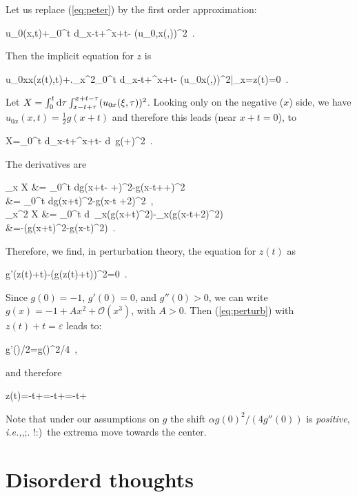 \documentclass[12pt,a4paper]{article}
\def\eref#1{(\ref{#1})}
\def\thecomma{\ifx,\thenewxt \else\ifx;\thenext \else\ifx.\thenext
	\else\ifx!\thenext \else\ifx:\thenext\else\ifx)\thenext \else \
	\fi\fi\fi\fi\fi\fi}
\def\condblank{\futurelet\thenext\thecomma}
\def\ie{{\it i.e.,}\condblank}
\numberwithin{equation}{section}
\theoremstyle{definition} %
\def\HALF{{\textstyle\frac{1}{2}}}
\def\d{{\rm d}}
\def\OO{{\mathcal O}}
\let\epsilon=\varepsilon
\begin{document}
Let us replace \eref{eq:peter} by the first order approximation:
\begin{equ}
 u_0(x,t)+\alpha \int_0^t \d\tau \int_{x-t+\tau }^{x+t-\tau }
 (u_{0,x}(\xi,\tau ))^2~.
\end{equ}
Then the implicit equation for $z$  is
\begin{equ}
  u_{0xx}(z(t),t)+\left .\alpha \partial_x^2\int_0^t \d\tau \int_{x-t+\tau }^{x+t-\tau }
  (u_{0x}(\xi,\tau ))^2\right|_{x=z(t)}=0~.
\end{equ}
Let $X=\int_0^t \d\tau \int_{x-t+\tau }^{x+t-\tau }
  (u_{0x}(\xi,\tau ))^2$.  
Looking only on the negative ($x$) side, we have $u_{0x}(x,t)=\HALF g(x+t)$ and therefore
this leads (near $x+t=0$), to
\begin{equ}
  X=\int_0^t \d\tau  \int_{x-t+\tau }^{x+t-\tau } \d \xi\, g(\xi+\tau)^2~.
\end{equ}
The derivatives are
\begin{equa}
  \partial_x X &= \int_0^t \d\tau  g(x+t-\tau
  +\tau)^2-g(x-t+\tau +\tau)^2\\
   &= \int_0^t \d\tau  g(x+t)^2-g(x-t +2\tau)^2~,\\
  \partial_x^2 X &= \int_0^t \d\tau \,
  \partial_x(g(x+t)^2)-\partial_x(g(x-t+2\tau)^2)\\
  &=-\frac{1}{4}\left(g(x+t)^2-g(x-t)^2\right)~.
\end{equa}
Therefore, we find, in perturbation theory, the equation for $z(t)$ as
\begin{equ}\label{eq:perturb}
  g'(z(t)+t)-(g(z(t)+t))^2=0~.
\end{equ}
Since $g(0)=-1$, $g'(0)=0$, and $g''(0)>0$, we can write
$g(x)=-1+Ax^2+\OO(x^3)$, with $A>0$.
Then \eref{eq:perturb} with $z(t)+t=\epsilon $ leads to:
\begin{equa}
  g'(\epsilon )/2=\alpha g(\epsilon )^2/4~,
\end{equa}
and therefore
\begin{equa}
  z(t)=-t+\epsilon =-t+=-t+
\end{equa}
Note that under our assumptions on $g$ the shift ${\alpha
  g(0)^2}/({4g''(0)})$ is \emph{positive}, \ie the extrema move
towards the center.


\section{Disorderd thoughts}
\end{document}
